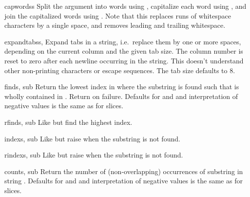 \begin{funcdesc}{capwords}{s}
  Split the argument into words using , capitalize
  each word using , and join the capitalized
  words using .  Note that this replaces runs of
  whitespace characters by a single space, and removes leading and
  trailing whitespace.
\end{funcdesc}

\begin{funcdesc}{expandtabs}{s, }
  Expand tabs in a string, i.e.\ replace them by one or more spaces,
  depending on the current column and the given tab size.  The column
  number is reset to zero after each newline occurring in the string.
  This doesn't understand other non-printing characters or escape
  sequences.  The tab size defaults to 8.
\end{funcdesc}

\begin{funcdesc}{find}{s, sub}
  Return the lowest index in  where the substring  is
  found such that  is wholly contained in
  .  Return  on failure.
  Defaults for  and  and interpretation of
  negative values is the same as for slices.
\end{funcdesc}

\begin{funcdesc}{rfind}{s, sub}
  Like  but find the highest index.
\end{funcdesc}

\begin{funcdesc}{index}{s, sub}
  Like  but raise  when the
  substring is not found.
\end{funcdesc}

\begin{funcdesc}{rindex}{s, sub}
  Like  but raise  when the
  substring is not found.
\end{funcdesc}

\begin{funcdesc}{count}{s, sub}
  Return the number of (non-overlapping) occurrences of substring
   in string .
  Defaults for  and  and interpretation of
  negative values is the same as for slices.
\end{funcdesc}

